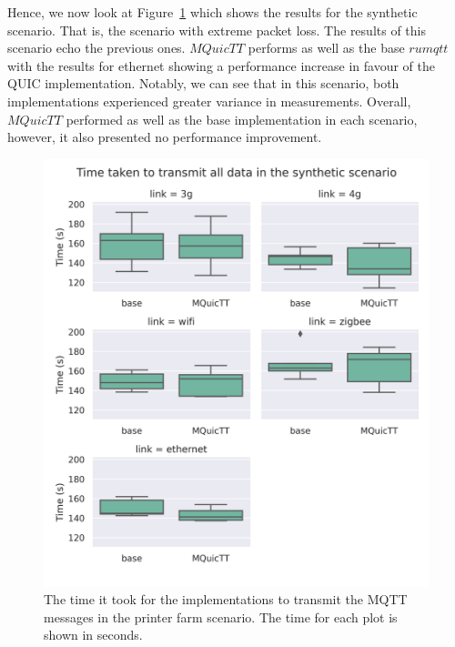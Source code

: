 Hence, we now look at Figure~\ref{fig:comm_time_synth} which shows the results for the synthetic scenario.
That is, the scenario with extreme packet loss.
The results of this scenario echo the previous ones.
$MQuicTT$ performs as well as the base $rumqtt$ with the results for ethernet showing a performance increase in favour of the QUIC implementation.
Notably, we can see that in this scenario, both implementations experienced greater variance in measurements.
Overall, $MQuicTT$ performed as well as the base implementation in each scenario, however, it also presented no performance improvement.

\begin{figure}
    \centering
    \includegraphics[width=1\linewidth]{images/analysis_comm_time_synth.png}
    \caption{The time it took for the implementations to transmit the MQTT messages in the printer farm scenario.
        The time for each plot is shown in seconds.}
    \label{fig:comm_time_synth}
\end{figure}